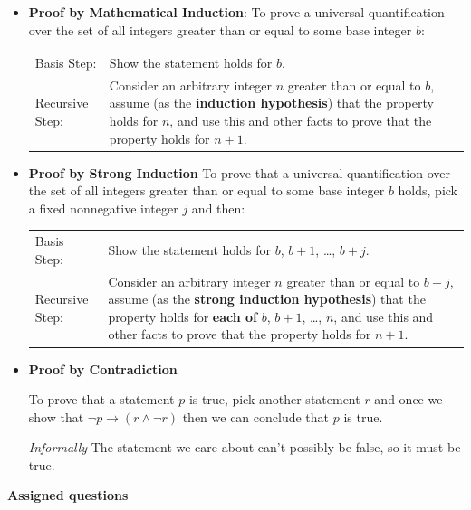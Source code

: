\begin{itemize}
    \item {\bf Proof by Mathematical Induction}: To prove a universal quantification over the set of  all integers greater than  or  equal to some base integer $b$:
    
    \begin{tabularx}{\textwidth}{l X}
        Basis Step: & Show the statement holds for $b$. \\
        Recursive Step: & Consider an arbitrary integer $n$ greater than or  equal to  $b$, assume
        (as the {\bf induction hypothesis})  that the property holds  for $n$, and use  this and
        other facts to  prove that  the property holds for $n+1$.
    \end{tabularx}
    
    \item {\bf Proof by Strong Induction} To prove that a universal quantification over the set of all integers greater than or equal to some  base integer $b$ holds,  pick a  fixed nonnegative integer  $j$ and then: \hfill 
    
    \begin{tabularx}{\textwidth}{l X}
        Basis Step: & Show the statement holds for $b$, $b+1$, \ldots, $b+j$. \\
        Recursive Step: & Consider an arbitrary integer $n$ greater than or  equal to  $b+j$, assume
        (as the {\bf strong  induction hypothesis})  that the property holds  for {\bf each of} $b$, $b+1$, \ldots, $n$, 	
        and use  this and
        other facts to  prove that  the property holds for $n+1$.
    \end{tabularx}

    \item {\bf Proof by Contradiction} 

    To prove that a statement $p$ is true, pick another statement $r$ and once we show
    that $\neg p  \to (r \wedge  \neg r)$ then  we can conclude that  $p$ is  true.
    
    {\it Informally} The statement we care about can't possibly be false, so it must be true.
\end{itemize}


\newpage
{\bf Assigned questions}

